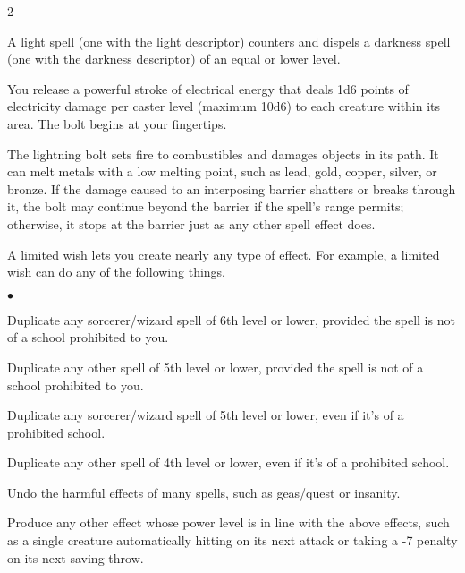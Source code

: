 \begin{multicols}{2}
\begin{small}
\smallskip\noindent A light spell (one with the light descriptor) counters and dispels a darkness spell (one with the darkness descriptor) of an equal or lower level.


\noindent You release a powerful stroke of electrical energy that deals 1d6 points of electricity damage per caster level (maximum 10d6) to each creature within its area. The bolt begins at your fingertips.

\smallskip\noindent The lightning bolt sets fire to combustibles and damages objects in its path. It can melt metals with a low melting point, such as lead, gold, copper, silver, or bronze. If the damage caused to an interposing barrier shatters or breaks through it, the bolt may continue beyond the barrier if the spell's range permits; otherwise, it stops at the barrier just as any other spell effect does.


\noindent A limited wish lets you create nearly any type of effect. For example, a limited wish can do any of the following things.

\begin{list}{$\bullet$}{\itemspace}
\item Duplicate any sorcerer/wizard spell of 6th level or lower, provided the spell is not of a school prohibited to you.
\item Duplicate any other spell of 5th level or lower, provided the spell is not of a school prohibited to you.
\item Duplicate any sorcerer/wizard spell of 5th level or lower, even if it's of a prohibited school.
\item Duplicate any other spell of 4th level or lower, even if it's of a prohibited school.
\item Undo the harmful effects of many spells, such as geas/quest or insanity.
\item Produce any other effect whose power level is in line with the above effects, such as a single creature automatically hitting on its next attack or taking a -7 penalty on its next saving throw.
\end{list}
  

\end{small}
\end{multicols}
